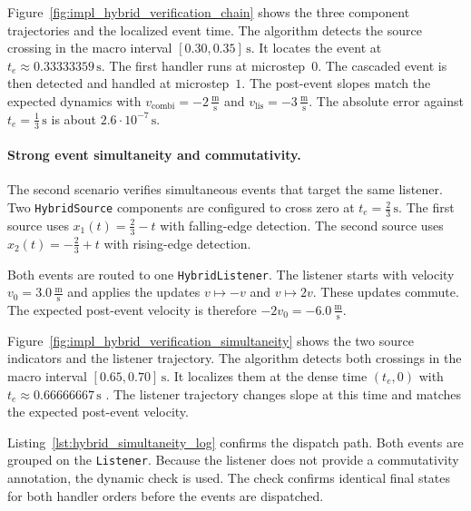 Figure~\ref{fig:impl_hybrid_verification_chain} shows the three component trajectories and the localized event time.
The algorithm detects the source crossing in the macro interval $[0.30,0.35]\, \mathrm{s}$.
It locates the event at $t_e \approx 0.33333359\, \mathrm{s}$.
The first handler runs at microstep~$0$.
The cascaded event is then detected and handled at microstep~$1$.
The post-event slopes match the expected dynamics with $v_{\mathrm{combi}}=-2\, \frac{\mathrm{m}}{\mathrm{s}}$ and $v_{\mathrm{lis}}=-3\, \frac{\mathrm{m}}{\mathrm{s}}$.
The absolute error against $t_e = \tfrac{1}{3}\, \mathrm{s}$ is about $2.6\cdot 10^{-7}\, \mathrm{s}$.

\paragraph{Strong event simultaneity and commutativity.}
The second scenario verifies simultaneous events that target the same listener.
Two \texttt{HybridSource} components are configured to cross zero at $t_e = \tfrac{2}{3}\, \mathrm{s}$.
The first source uses $x_1(t)=\tfrac{2}{3}-t$ with falling-edge detection.
The second source uses $x_2(t)=-\tfrac{2}{3}+t$ with rising-edge detection.

Both events are routed to one \texttt{HybridListener}.
The listener starts with velocity $v_0=3.0\, \frac{\mathrm{m}}{\mathrm{s}}$ and applies the updates $v \mapsto -v$ and $v \mapsto 2v$.
These updates commute.
The expected post-event velocity is therefore $-2v_0=-6.0\, \frac{\mathrm{m}}{\mathrm{s}}$.

Figure~\ref{fig:impl_hybrid_verification_simultaneity} shows the two source indicators and the listener trajectory.
The algorithm detects both crossings in the macro interval $[0.65,0.70]\, \mathrm{s}$.
It localizes them at the dense time $(t_e,0)$ with $t_e \approx 0.66666667\, \mathrm{s}$    .
The listener trajectory changes slope at this time and matches the expected post-event velocity.

Listing~\ref{lst:hybrid_simultaneity_log} confirms the dispatch path.
Both events are grouped on the \texttt{Listener}.
Because the listener does not provide a commutativity annotation, the dynamic check is used.
The check confirms identical final states for both handler orders before the events are dispatched.

